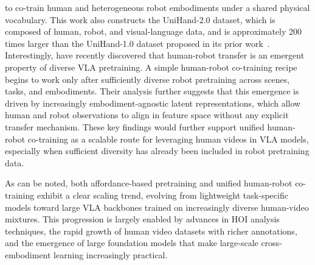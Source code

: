 \documentclass[Afour,sageh,times]{sagej}
\begin{document}
to co-train human and heterogeneous robot embodiments under a shared physical vocabulary. This work also constructs the UniHand-2.0 dataset, which is composed of human, robot, and visual-language data, and is approximately 200 times larger than the UniHand-1.0 dataset proposed in its prior work~\citep{luo2025being}. Interestingly, \cite{kareer2025emergence} have recently discovered that human-robot transfer is an emergent property of diverse VLA pretraining. A simple human-robot co-training recipe begins to work only after sufficiently diverse robot pretraining across scenes, tasks, and embodiments. Their analysis further suggests that this emergence is driven by increasingly embodiment-agnostic latent representations, which allow human and robot observations to align in feature space without any explicit transfer mechanism. These key findings would further support unified human-robot co-training as a scalable route for leveraging human videos in VLA models, especially when sufficient diversity has already been included in robot pretraining data. 

As can be noted, both affordance-based pretraining and unified human-robot co-training exhibit a clear scaling trend, evolving from lightweight task-specific models toward large VLA backbones trained on increasingly diverse human-video mixtures. This progression is largely enabled by advances in HOI analysis techniques, the rapid growth of human video datasets with richer annotations, and the emergence of large foundation models that make large-scale cross-embodiment learning increasingly practical.
\end{document}
